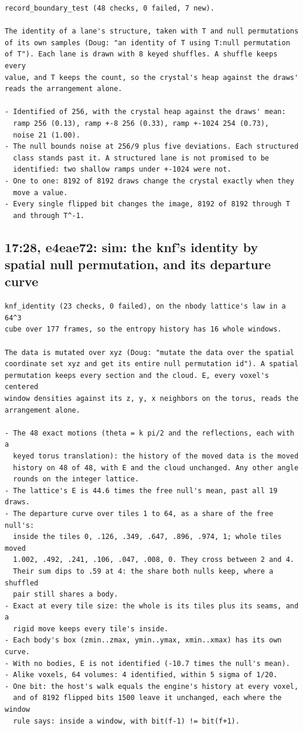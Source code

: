 \begin{Verbatim}
record_boundary_test (48 checks, 0 failed, 7 new).

The identity of a lane's structure, taken with T and null permutations
of its own samples (Doug: "an identity of T using T:null permutation
of T"). Each lane is drawn with 8 keyed shuffles. A shuffle keeps every
value, and T keeps the count, so the crystal's heap against the draws'
reads the arrangement alone.

- Identified of 256, with the crystal heap against the draws' mean:
  ramp 256 (0.13), ramp +-8 256 (0.33), ramp +-1024 254 (0.73),
  noise 21 (1.00).
- The null bounds noise at 256/9 plus five deviations. Each structured
  class stands past it. A structured lane is not promised to be
  identified: two shallow ramps under +-1024 were not.
- One to one: 8192 of 8192 draws change the crystal exactly when they
  move a value.
- Every single flipped bit changes the image, 8192 of 8192 through T
  and through T^-1.
\end{Verbatim}

\subsection{\texorpdfstring{17:28, e4eae72: sim: the knf's identity by spatial null permutation, and its departure curve}{17:28, e4eae72: sim: the knf's identity by spatial null permutation, and its departure curve}}

\begin{Verbatim}
knf_identity (23 checks, 0 failed), on the nbody lattice's law in a 64^3
cube over 177 frames, so the entropy history has 16 whole windows.

The data is mutated over xyz (Doug: "mutate the data over the spatial
coordinate set xyz and get its entire null permutation id"). A spatial
permutation keeps every section and the cloud. E, every voxel's centered
window densities against its z, y, x neighbors on the torus, reads the
arrangement alone.

- The 48 exact motions (theta = k pi/2 and the reflections, each with a
  keyed torus translation): the history of the moved data is the moved
  history on 48 of 48, with E and the cloud unchanged. Any other angle
  rounds on the integer lattice.
- The lattice's E is 44.6 times the free null's mean, past all 19 draws.
- The departure curve over tiles 1 to 64, as a share of the free null's:
  inside the tiles 0, .126, .349, .647, .896, .974, 1; whole tiles moved
  1.002, .492, .241, .106, .047, .008, 0. They cross between 2 and 4.
  Their sum dips to .59 at 4: the share both nulls keep, where a shuffled
  pair still shares a body.
- Exact at every tile size: the whole is its tiles plus its seams, and a
  rigid move keeps every tile's inside.
- Each body's box (zmin..zmax, ymin..ymax, xmin..xmax) has its own curve.
- With no bodies, E is not identified (-10.7 times the null's mean).
- Alike voxels, 64 volumes: 4 identified, within 5 sigma of 1/20.
- One bit: the host's walk equals the engine's history at every voxel,
  and of 8192 flipped bits 1500 leave it unchanged, each where the window
  rule says: inside a window, with bit(f-1) != bit(f+1).
\end{Verbatim}

